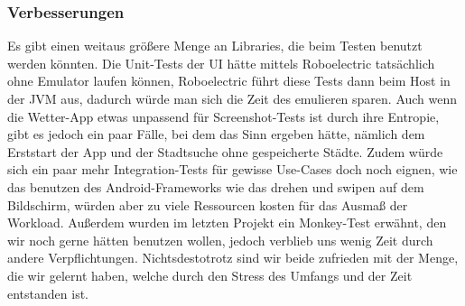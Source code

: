\documentclass{article}
\begin{document}
\subsubsection{Verbesserungen}

Es gibt einen weitaus größere Menge an Libraries, die beim Testen benutzt werden könnten. Die Unit-Tests der UI hätte mittels Roboelectric tatsächlich ohne Emulator laufen können, Roboelectric führt diese Tests dann beim Host in der JVM aus, dadurch würde man sich die Zeit des emulieren sparen. Auch wenn die Wetter-App etwas unpassend für Screenshot-Tests ist durch ihre Entropie, gibt es jedoch ein paar Fälle, bei dem das Sinn ergeben hätte, nämlich dem Erststart der App und der Stadtsuche ohne gespeicherte Städte. Zudem würde sich ein paar mehr Integration-Tests für gewisse Use-Cases doch noch eignen, wie das benutzen des Android-Frameworks wie das drehen und swipen auf dem Bildschirm, würden aber zu viele Ressourcen kosten für das Ausmaß der Workload. Außerdem wurden im letzten Projekt ein Monkey-Test erwähnt, den wir noch gerne hätten benutzen wollen, jedoch verblieb uns wenig Zeit durch andere Verpflichtungen. Nichtsdestotrotz sind wir beide zufrieden mit der Menge, die wir gelernt haben, welche durch den Stress des Umfangs und der Zeit entstanden ist.



\end{document}
